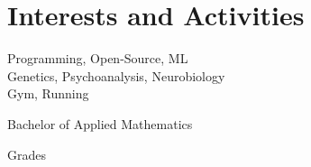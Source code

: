 \documentclass[a4paper,10pt]{article} %
\begin{document}

\section{Interests and Activities}

Programming, Open-Source, ML\\
Genetics, Psychoanalysis, Neurobiology\\
Gym, Running


\newpage


\par{\centering\Large \hypertarget{grds}{Bachelor of Applied Mathematics}\par}\large{\centering Grades\par}\normalsize
\end{document}
